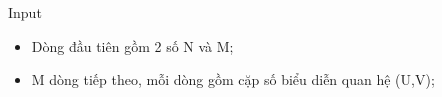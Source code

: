 Input  
\begin{itemize}
	\item     Dòng đầu tiên gồm 2 số N và M;   
	\item     M dòng tiếp theo, mỗi dòng gồm cặp số biểu diễn quan hệ (U,V);   
\end{itemize}